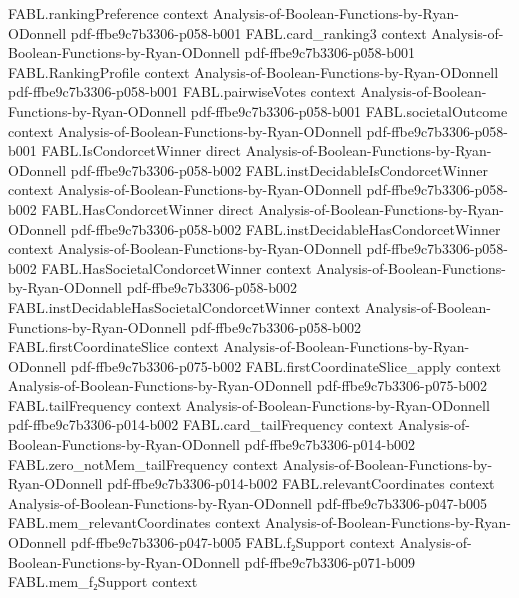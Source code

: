 \begin{theorem}
  {FABL.rankingPreference}
  {context}
  {Analysis-of-Boolean-Functions-by-Ryan-ODonnell}
  {pdf-ffbe9c7b3306-p058-b001}
\proofstep
  {FABL.card_ranking3}
  {context}
  {Analysis-of-Boolean-Functions-by-Ryan-ODonnell}
  {pdf-ffbe9c7b3306-p058-b001}
\proofstep
  {FABL.RankingProfile}
  {context}
  {Analysis-of-Boolean-Functions-by-Ryan-ODonnell}
  {pdf-ffbe9c7b3306-p058-b001}
\proofstep
  {FABL.pairwiseVotes}
  {context}
  {Analysis-of-Boolean-Functions-by-Ryan-ODonnell}
  {pdf-ffbe9c7b3306-p058-b001}
\proofstep
  {FABL.societalOutcome}
  {context}
  {Analysis-of-Boolean-Functions-by-Ryan-ODonnell}
  {pdf-ffbe9c7b3306-p058-b001}
\proofstep
  {FABL.IsCondorcetWinner}
  {direct}
  {Analysis-of-Boolean-Functions-by-Ryan-ODonnell}
  {pdf-ffbe9c7b3306-p058-b002}
\proofstep
  {FABL.instDecidableIsCondorcetWinner}
  {context}
  {Analysis-of-Boolean-Functions-by-Ryan-ODonnell}
  {pdf-ffbe9c7b3306-p058-b002}
\proofstep
  {FABL.HasCondorcetWinner}
  {direct}
  {Analysis-of-Boolean-Functions-by-Ryan-ODonnell}
  {pdf-ffbe9c7b3306-p058-b002}
\proofstep
  {FABL.instDecidableHasCondorcetWinner}
  {context}
  {Analysis-of-Boolean-Functions-by-Ryan-ODonnell}
  {pdf-ffbe9c7b3306-p058-b002}
\proofstep
  {FABL.HasSocietalCondorcetWinner}
  {context}
  {Analysis-of-Boolean-Functions-by-Ryan-ODonnell}
  {pdf-ffbe9c7b3306-p058-b002}
\proofstep
  {FABL.instDecidableHasSocietalCondorcetWinner}
  {context}
  {Analysis-of-Boolean-Functions-by-Ryan-ODonnell}
  {pdf-ffbe9c7b3306-p058-b002}
\proofstep
  {FABL.firstCoordinateSlice}
  {context}
  {Analysis-of-Boolean-Functions-by-Ryan-ODonnell}
  {pdf-ffbe9c7b3306-p075-b002}
\proofstep
  {FABL.firstCoordinateSlice_apply}
  {context}
  {Analysis-of-Boolean-Functions-by-Ryan-ODonnell}
  {pdf-ffbe9c7b3306-p075-b002}
\proofstep
  {FABL.tailFrequency}
  {context}
  {Analysis-of-Boolean-Functions-by-Ryan-ODonnell}
  {pdf-ffbe9c7b3306-p014-b002}
\proofstep
  {FABL.card_tailFrequency}
  {context}
  {Analysis-of-Boolean-Functions-by-Ryan-ODonnell}
  {pdf-ffbe9c7b3306-p014-b002}
\proofstep
  {FABL.zero_notMem_tailFrequency}
  {context}
  {Analysis-of-Boolean-Functions-by-Ryan-ODonnell}
  {pdf-ffbe9c7b3306-p014-b002}
\proofstep
  {FABL.relevantCoordinates}
  {context}
  {Analysis-of-Boolean-Functions-by-Ryan-ODonnell}
  {pdf-ffbe9c7b3306-p047-b005}
\proofstep
  {FABL.mem_relevantCoordinates}
  {context}
  {Analysis-of-Boolean-Functions-by-Ryan-ODonnell}
  {pdf-ffbe9c7b3306-p047-b005}
\proofstep
  {FABL.f₂Support}
  {context}
  {Analysis-of-Boolean-Functions-by-Ryan-ODonnell}
  {pdf-ffbe9c7b3306-p071-b009}
\proofstep
  {FABL.mem_f₂Support}
  {context}

\end{theorem}
